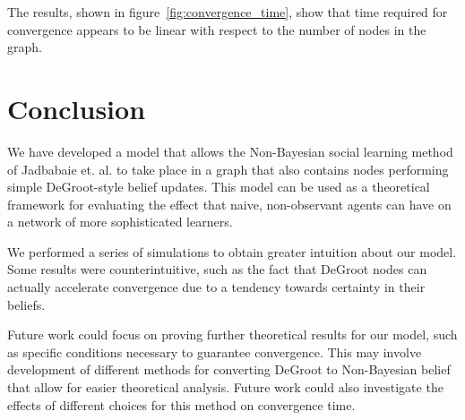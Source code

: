 \documentclass[letterpaper, 11pt, conference]{ieeeconf}
\begin{document}
The results, shown in figure~\ref{fig:convergence_time}, show that time required for convergence appears to be linear with respect to the number of nodes in the graph.

\section{Conclusion}

We have developed a model that allows the Non-Bayesian social learning method of Jadbabaie et. al. to take place in a graph that also contains nodes performing simple DeGroot-style belief updates.  This model can be used as a theoretical framework for evaluating the effect that naive, non-observant agents can have on a network of more sophisticated learners.

We performed a series of simulations to obtain greater intuition about our model.  Some results were counterintuitive, such as the fact that DeGroot nodes can actually accelerate convergence due to a tendency towards certainty in their beliefs.

Future work could focus on proving further theoretical results for our model, such as specific conditions necessary to guarantee convergence.  This may involve development of different methods for converting DeGroot to Non-Bayesian belief that allow for easier theoretical analysis.  Future work could also investigate the effects of different choices for this method on convergence time.



\end{document}
